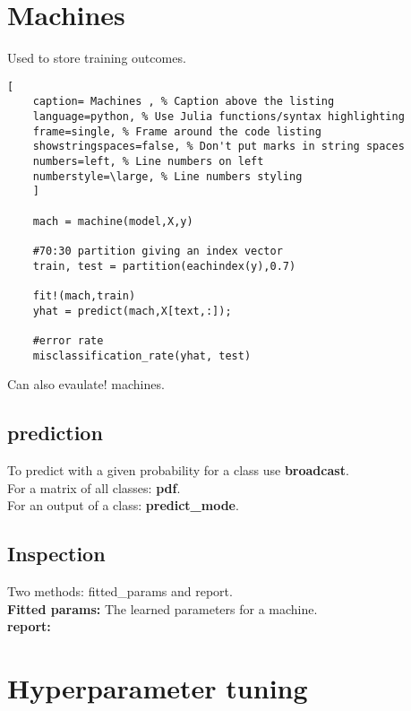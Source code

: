 \documentclass[11pt]{scrartcl} %
\begin{document}
\newpage

\section{Machines}

Used to store training outcomes.

\begin{lstlisting}[
	caption= Machines , % Caption above the listing
	language=python, % Use Julia functions/syntax highlighting
	frame=single, % Frame around the code listing
	showstringspaces=false, % Don't put marks in string spaces
	numbers=left, % Line numbers on left
	numberstyle=\large, % Line numbers styling
	]

	mach = machine(model,X,y)
	
	#70:30 partition giving an index vector
	train, test = partition(eachindex(y),0.7)

	fit!(mach,train)
	yhat = predict(mach,X[text,:]);

	#error rate
	misclassification_rate(yhat, test)

\end{lstlisting}

Can also evaulate! machines.

\subsection{prediction}

To predict with a given probability for a class use \textbf{broadcast}.\\

For a matrix of all classes: \textbf{pdf}.\\

For an output of a class: \textbf{predict\_mode}.

\subsection{Inspection}

Two methods: fitted_params and report.\\

\textbf{Fitted params:} The learned parameters for a machine.\\

\textbf{report:} 

\section{Hyperparameter tuning}
\end{document}
